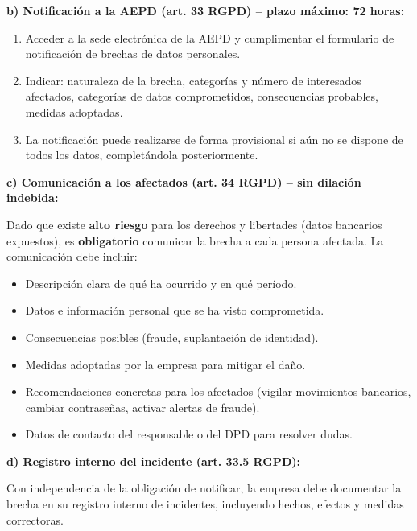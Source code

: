 \begin{solution}
	\textbf{b) Notificación a la AEPD (art. 33 RGPD) -- plazo máximo: 72 horas:}
	\begin{enumerate}[label=\arabic*.]
		\item Acceder a la sede electrónica de la AEPD y cumplimentar el formulario de notificación
		      de brechas de datos personales.
		\item Indicar: naturaleza de la brecha, categorías y número de interesados afectados,
		      categorías de datos comprometidos, consecuencias probables, medidas adoptadas.
		\item La notificación puede realizarse de forma provisional si aún no se dispone de todos
		      los datos, completándola posteriormente.
	\end{enumerate}

	\textbf{c) Comunicación a los afectados (art. 34 RGPD) -- sin dilación indebida:}

	Dado que existe \textbf{alto riesgo} para los derechos y libertades (datos bancarios expuestos),
	es \textbf{obligatorio} comunicar la brecha a cada persona afectada. La comunicación debe incluir:
	\begin{itemize}
		\item Descripción clara de qué ha ocurrido y en qué período.
		\item Datos e información personal que se ha visto comprometida.
		\item Consecuencias posibles (fraude, suplantación de identidad).
		\item Medidas adoptadas por la empresa para mitigar el daño.
		\item Recomendaciones concretas para los afectados (vigilar movimientos bancarios,
		      cambiar contraseñas, activar alertas de fraude).
		\item Datos de contacto del responsable o del DPD para resolver dudas.
	\end{itemize}

	\textbf{d) Registro interno del incidente (art. 33.5 RGPD):}

	Con independencia de la obligación de notificar, la empresa debe documentar la brecha en su
	registro interno de incidentes, incluyendo hechos, efectos y medidas correctoras.

\end{solution}
